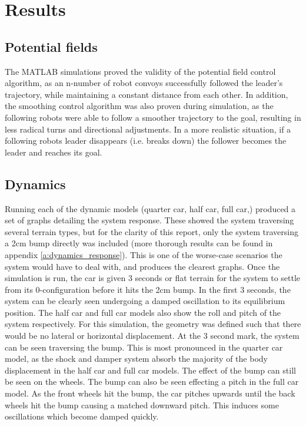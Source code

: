 \chapter{Results}
\section{Potential fields}
The MATLAB simulations proved the validity of the potential field control algorithm, as an n-number of robot convoys successfully followed the leader's trajectory, while maintaining a constant distance from each other. In addition, the smoothing control algorithm was also proven during simulation, as the following robots were able to follow a smoother trajectory to the goal, resulting in less radical turns and directional adjustments. In a more realistic situation, if a following robots leader disappears (i.e. breaks down) the follower becomes the leader and reaches its goal.

\section{Dynamics}
Running each of the dynamic models (quarter car, half car, full car,) produced a set of graphs detailing the system response. These showed the system traversing several terrain types, but for the clarity of this report, only the system traversing a 2cm bump directly was included (more thorough results can be found in appendix \ref{a:dynamics_response}). This is one of the worse-case scenarios the system would have to deal with, and produces the clearest graphs. Once the simulation is run, the car is given 3 seconds or flat terrain for the system to settle from its 0-configuration before it hits the 2cm bump. In the first 3 seconds, the system can be clearly seen undergoing a damped oscillation to its equilibrium position. The half car and full car models also show the roll and pitch of the system respectively. For this simulation, the geometry was defined such that there would be no lateral or horizontal displacement. At the 3 second mark, the system can be seen traversing the bump. This is most pronounced in the quarter car model, as the shock and damper system absorb the majority of the body displacement in the half car and full car models. The effect of the bump can still be seen on the wheels. The bump can also be seen effecting a pitch in the full car model. As the front wheels hit the bump, the car pitches upwards until the back wheels hit the bump causing a matched downward pitch. This induces some oscillations which become damped quickly.

